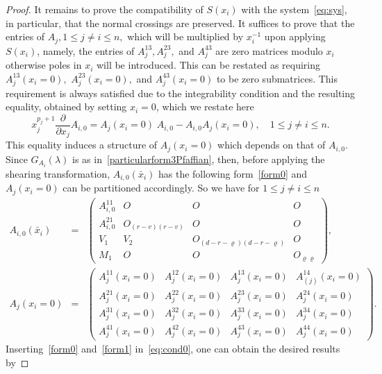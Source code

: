 \documentclass[final,1p,times,number,amsthm]{elsart}
\newcommand{\pder}[2]{\frac{\partial}{\partial #2}#1}
\begin{document}
\begin{proof}
\noindent It remains to prove the compatibility of $S(x_i)$ with the
system~\eqref{eq:sys}, in particular, that the normal crossings are
preserved. It suffices to prove that the entries of
${A}_{j} , 1 \leq j \neq i \leq n, $ which will be multiplied by $x_{i}^{-1}$
upon applying $S(x_i)$, namely, the entries of $A_{j}^{13}, A_{j}^{23},$ and
$A_{j}^{43}$ are zero matrices modulo $x_i$ otherwise poles in $x_{i}$ will be
introduced. This can be restated as requiring $A_{j}^{13}({x}_{i} = 0),$
$A_{j}^{23}({x}_{i} = 0),$ and $A_{j}^{43}({x}_{i} = 0)$ to be zero
submatrices. This requirement is always satisfied due to the integrability
condition and the resulting equality, obtained by setting $x_i=0$, which we
restate here
 \begin{equation}
 \label{eq:cond0}
 x_j^{p_j+1}\pder{A_{i,0}}{x_j}= A_{j}(x_i=0)\;A_{i,0} - A_{i,0} A_{j}(x_i=0) ,
\quad 1 \leq j \neq i \leq n .
\end{equation}
This equality induces a structure of $A_{j}(x_i=0)$ which depends on that of
$A_{i,0}$. Since $G_{A_{i}} (\lambda)$ is as in~\eqref{particularform3Pfaffian},
then, before applying the shearing transformation,
$A_{i,0} ({\bar{x}}_{i})$ has the following form~\eqref{form0} and
$A_{j} (x_i = 0)$ can be partitioned accordingly. So we have for
$1 \leq j \neq i \leq n$ 
\begin{eqnarray} \label{form0} A_{i,0}({\bar{x}}_{i}) &=&\left(\begin{matrix}
A_{i,0}^{11} & O & O & O \\[5pt] A_{i,0}^{21} & O_{(r-v)(r-v)} & O & O \\[5pt]
V_1 & V_2 & O_{(d-r-\varrho)(d-r-\varrho)} & O \\[5pt] M_1 & O& O & O_{\varrho
\varrho} \end{matrix}\right) ,\\[10pt]
 \label{form1} A_{j}(x_i=0) &=& \left(\begin{matrix} A_{j}^{11}(x_i=0) &
A_{j}^{12}(x_i=0)& A_{j}^{13}(x_i=0)& A_{(j)}^{14}(x_i=0) \\[5pt]
A_{j}^{21}(x_i=0) & A_{j}^{22}(x_i=0) & A_{j}^{23}(x_i=0) &
A_{j}^{24}(x_i=0)\\[5pt] A_{j}^{31}(x_i=0) & A_{j}^{32}(x_i=0) &
A_{j}^{33}(x_i=0)& A_{j}^{34}(x_i=0)\\[5pt] A_{j}^{41}(x_i=0) &
A_{j}^{42}(x_i=0) & A_{j}^{43}(x_i=0) &
A_{j}^{44}(x_i=0) \end{matrix}\right). \end{eqnarray} Inserting~\eqref{form0}
and~\eqref{form1} in~\eqref{eq:cond0}, one can obtain the desired results by

\end{proof}
\end{document}
